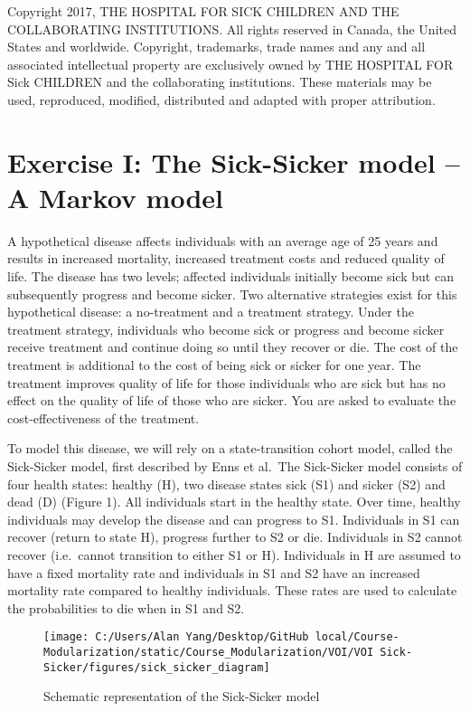 \documentclass[
]{article}
\begin{document}
Copyright 2017, THE HOSPITAL FOR SICK CHILDREN AND THE COLLABORATING
INSTITUTIONS. All rights reserved in Canada, the United States and
worldwide. Copyright, trademarks, trade names and any and all associated
intellectual property are exclusively owned by THE HOSPITAL FOR Sick
CHILDREN and the collaborating institutions. These materials may be
used, reproduced, modified, distributed and adapted with proper
attribution.

\hypertarget{exercise-i-the-sick-sicker-model-a-markov-model}{%
\section{Exercise I: The Sick-Sicker model -- A Markov
model}\label{exercise-i-the-sick-sicker-model-a-markov-model}}

A hypothetical disease affects individuals with an average age of 25
years and results in increased mortality, increased treatment costs and
reduced quality of life. The disease has two levels; affected
individuals initially become sick but can subsequently progress and
become sicker. Two alternative strategies exist for this hypothetical
disease: a no-treatment and a treatment strategy. Under the treatment
strategy, individuals who become sick or progress and become sicker
receive treatment and continue doing so until they recover or die. The
cost of the treatment is additional to the cost of being sick or sicker
for one year. The treatment improves quality of life for those
individuals who are sick but has no effect on the quality of life of
those who are sicker. You are asked to evaluate the cost-effectiveness
of the treatment.

To model this disease, we will rely on a state-transition cohort model,
called the Sick-Sicker model, first described by Enns et al.~The
Sick-Sicker model consists of four health states: healthy (H), two
disease states sick (S1) and sicker (S2) and dead (D) (Figure 1). All
individuals start in the healthy state. Over time, healthy individuals
may develop the disease and can progress to S1. Individuals in S1 can
recover (return to state H), progress further to S2 or die. Individuals
in S2 cannot recover (i.e.~cannot transition to either S1 or H).
Individuals in H are assumed to have a fixed mortality rate and
individuals in S1 and S2 have an increased mortality rate compared to
healthy individuals. These rates are used to calculate the probabilities
to die when in S1 and S2.

\begin{figure}

{\centering \texttt{[image: C:/Users/Alan Yang/Desktop/GitHub local/Course-Modularization/static/Course\_Modularization/VOI/VOI Sick-Sicker/figures/sick\_sicker\_diagram]} 

}

\caption{Schematic representation of the Sick-Sicker model}\label{fig:unnamed-chunk-1}
\end{figure}
\end{document}
